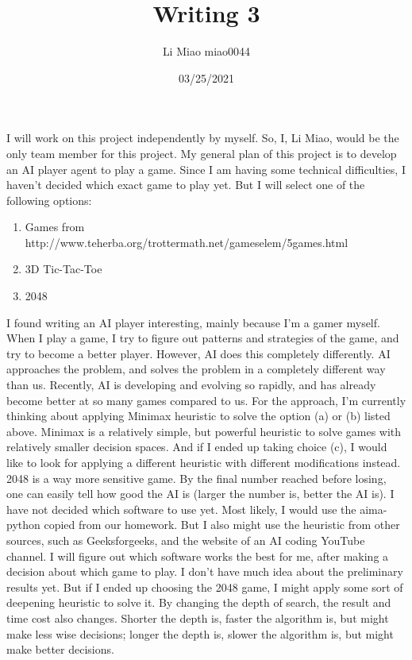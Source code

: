 \documentclass{article}
\title{Writing 3}
\author{Li Miao   miao0044}
\date{03/25/2021}
\begin{document}
\maketitle
\noindent
I will work on this project independently by myself. So, I, Li Miao, would be the only team member for this project.
\newline
\newline
My general plan of this project is to develop an AI player agent to play a game. Since I am having some technical difficulties, I haven’t decided which exact game to play yet. But I will select one of the following options:
\begin{enumerate}[label=(\alph*)]
\item Games from http://www.teherba.org/trottermath.net/gameselem/5games.html
\item 3D Tic-Tac-Toe
\item 2048
\end{enumerate}
I found writing an AI player interesting, mainly because I’m a gamer myself. When I play a game, I try to figure out patterns and strategies of the game, and try to become a better player. However, AI does this completely differently. AI approaches the problem, and solves the problem in a completely different way than us. Recently, AI is developing and evolving so rapidly, and has already become better at so many games compared to us.
\newline
\newline
For the approach, I’m currently thinking about applying Minimax heuristic to solve the option (a) or (b) listed above. Minimax is a relatively simple, but powerful heuristic to solve games with relatively smaller decision spaces. And if I ended up taking choice (c), I would like to look for applying a different heuristic with different modifications instead. 2048 is a way more sensitive game. By the final number reached before losing, one can easily tell how good the AI is (larger the number is, better the AI is).
\newline
\newline
I have not decided which software to use yet. Most likely, I would use the aima-python copied from our homework. But I also might use the heuristic from other sources, such as Geeksforgeeks, and the website of an AI coding YouTube channel. I will figure out which software works the best for me, after making a decision about which game to play.
I don’t have much idea about the preliminary results yet. But if I ended up choosing the 2048 game, I might apply some sort of deepening heuristic to solve it. By changing the depth of search, the result and time cost also changes. Shorter the depth is, faster the algorithm is, but might make less wise decisions; longer the depth is, slower the algorithm is, but might make better decisions.
\end{document}
